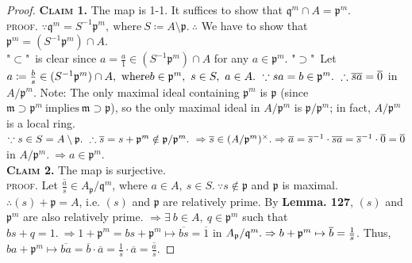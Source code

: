 \documentclass[12pt,a4paper,footinclude=true,headinclude=true]{scrbook} %
\begin{document}
\begin{proof}
    \textsc{\textbf{Claim 1.}} The map is 1-1. It suffices to show that $\mathfrak{q}^m\cap A=\mathfrak{p}^m$. \\ \textsc{proof.}
    $\because\mathfrak{q}^m=S^{-1}\mathfrak{p}^m,\ \text{where}\ S\coloneqq A\setminus\mathfrak{p}.\ \therefore$ We have to show that $\mathfrak{p}^m=(S^{-1}\mathfrak{p}^m)\cap A$. \\ "$\subset$"\ is clear since $a=\frac{a}{1}\in(S^{-1}\mathfrak{p}^m)\cap A$ for any $a\in\mathfrak{p}^m$. "$\supset$"\ Let $a\coloneqq\frac{b}{s}\in(S^{-1}\mathfrak{p}^m)\cap A,\ \text{where}\\ b\in \mathfrak{p}^m,\ s\in S,\ a\in A.\ \because sa=b\in\mathfrak{p}^m.\ \therefore \overline{sa}=\overline{0}$ in $A/\mathfrak{p}^m$. Note: The only maximal ideal containing $\mathfrak{p}^m$ is $\mathfrak{p}$ (since $\mathfrak{m}\supset\mathfrak{p}^m\ \text{implies}\ \mathfrak{m}\supset \mathfrak{p}$), so the only maximal ideal in $A/\mathfrak{p}^m$ is $\mathfrak{p}/\mathfrak{p}^m$; in fact, $A/\mathfrak{p}^m$ is a local ring. $\because s\in S=A\setminus\mathfrak{p}.\ \therefore \overline{s}=s+\mathfrak{p}^m\notin\mathfrak{p}/\mathfrak{p}^m.\ \Rightarrow \overline{s}\in(A/\mathfrak{p}^m)^\times.\\ \Rightarrow \overline{a}=\overline{s}^{-1}\cdot\overline{sa}=\overline{s}^{-1}\cdot \overline{0}=\overline{0}$ in $A/\mathfrak{p}^m.\ \Rightarrow a\in\mathfrak{p}^m$.\\
    \textsc{\textbf{Claim 2.}} The map is surjective. \\ \textsc{proof.}
    Let $\overline{\frac{a}{s}}\in A_\mathfrak{p}/\mathfrak{q}^m$, where $a\in A,\ s\in S.\ \because s\notin\mathfrak{p}$ and $\mathfrak{p}$ is maximal. $\therefore (s)+\mathfrak{p}=A$, i.e. $(s)$ and $\mathfrak{p}$ are relatively prime. By \textbf{Lemma. 127}, $(s)$ and $\mathfrak{p}^m$ are also relatively prime. $\Rightarrow\exists\ b\in A,\ q\in\mathfrak{p}^m$ such that $bs+q=1.\ \Rightarrow 
    1+\mathfrak{p}^m=bs+\mathfrak{p}^m\mapsto\overline{bs}=\overline{1}$ in $A_\mathfrak{p}/\mathfrak{q}^m.\\ \Rightarrow b+\mathfrak{p}^m\mapsto \overline{b}=\frac{1}{\overline{s}}$. Thus, $ba+\mathfrak{p}^m\mapsto \overline{ba}=\overline{b}\cdot\overline{a}=\frac{1}{\overline{s}}\cdot\overline{a}= \overline{\frac{a}{s}}$.
\end{proof}
\end{document}
